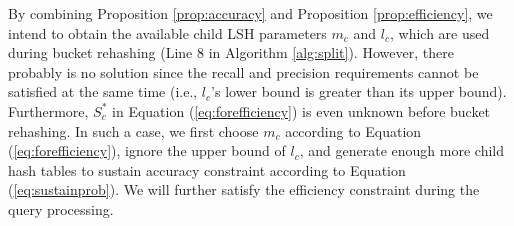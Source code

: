 
By combining Proposition \ref{prop:accuracy} and Proposition \ref{prop:efficiency}, we intend to obtain the available child LSH parameters $m_c$ and $l_c$, which are used during bucket rehashing (Line 8 in Algorithm \ref{alg:split}). However, there probably is no solution since the recall and precision requirements cannot be satisfied at the same time (i.e., $l_c$'s lower bound is greater than its upper bound). Furthermore, $S_c^*$ in Equation (\ref{eq:forefficiency}) is even unknown before bucket rehashing. In such a case, we first choose $m_c$ according to Equation (\ref{eq:forefficiency}), ignore the upper bound of $l_c$, and generate enough more child hash tables to sustain accuracy constraint according to Equation (\ref{eq:sustainprob}). We will further satisfy the efficiency constraint during the query processing.


